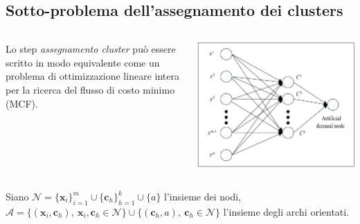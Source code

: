 \documentclass{beamer}
\begin{document}
\subsection{Sotto-problema dell'assegnamento dei clusters}
\begin{frame}
	\begin{columns}
		\begin{column}{0.5\textwidth}
			Lo step \textit{assegnamento cluster} può essere scritto in modo equivalente come un problema di ottimizzazione lineare intera per la ricerca del flusso di costo minimo (MCF).  
		\end{column}
		\begin{column}{0.5\textwidth}
			\begin{center}
				\includegraphics[width=1\textwidth]{MCF.png}      
			\end{center}
		\end{column}
	\end{columns}
	\vspace{0.3cm}
	Siano $\mathcal{N} = \{\textbf{x}_i\}_{i=1}^m \cup \{\textbf{c}_h\}_{h=1}^k \cup \{a\}$ l'insieme dei nodi, $\mathcal{A} = \{(\textbf{x}_i,\textbf{c}_h), \ \textbf{x}_i,\textbf{c}_h \in \mathcal{N}\} \cup \{(\textbf{c}_h, a), \ \textbf{c}_h \in \mathcal{N}\}$ l'insieme degli archi orientati. 	
\end{frame}
\end{document}
